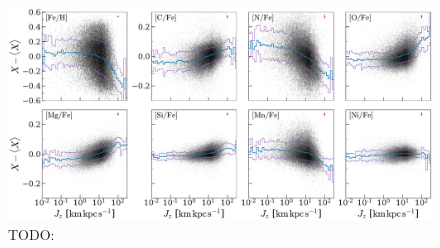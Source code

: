\documentclass[modern]{aastex63}
\newcommand{\mdisk}{\ensuremath{\mathrm{M}_\mathrm{disk}}}
\newcommand{\mratio}{\ensuremath{\mdisk / \mdisk^\star}}
\begin{document}
\begin{figure}[!tp]
  \begin{mdframed}
  \color{captiongray}
  \begin{center}
  \includegraphics[width=\textwidth]{elem-Jz-gradients.pdf}
  \end{center}
  \caption{%
    TODO:
    \label{fig:elem-Jz-gradients}}
  \end{mdframed}
\end{figure}


\end{document}
